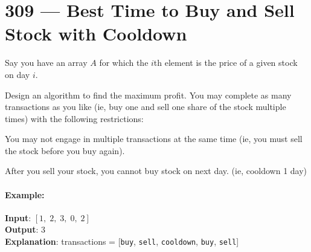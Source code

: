 \section{309 --- Best Time to Buy and Sell Stock with Cooldown}
Say you have an array $A$ for which the $ i $th element is the price of a given stock on day $ i $.
\par
Design an algorithm to find the maximum profit. You may complete as many transactions as you like (ie, buy one and sell one share of the stock multiple times) with the following restrictions:
\par
You may not engage in multiple transactions at the same time (ie, you must sell the stock before you buy again).
\par
After you sell your stock, you cannot buy stock on next day. (ie, cooldown 1 day)

\paragraph{Example:}

\begin{flushleft}
\textbf{Input}: $ [1,\;2,\;3,\;0,\;2] $
\\
\textbf{Output}: 3 
\\
\textbf{Explanation}: transactions = [\texttt{buy}, \texttt{sell}, \texttt{cooldown}, \texttt{buy}, \texttt{sell}]
\end{flushleft}

